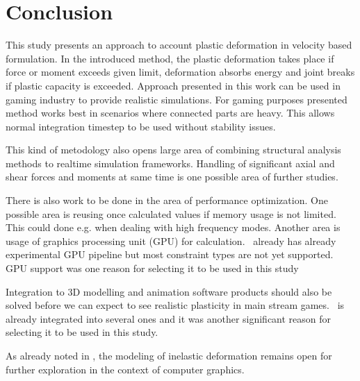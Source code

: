 \section{Conclusion}

This study presents an approach to account plastic deformation in 
velocity based formulation.
In the introduced method, the plastic deformation takes place if force or moment exceeds given 
limit, deformation absorbs energy and joint breaks if plastic capacity is exceeded. 
Approach presented in this work can be used in gaming industry to provide realistic 
simulations. 
For gaming purposes presented method works 
best in scenarios where connected parts are heavy. This allows normal 
integration timestep to be used without stability issues. 

This kind of metodology also opens large area of combining  structural analysis
methods to realtime simulation frameworks.
Handling of significant axial and shear forces and moments at same time
is one possible area of further studies.

There is also work to be done in the area of performance optimization.
One possible area is reusing once calculated values if memory usage is not limited.
This could done e.g. when dealing with high frequency modes.
Another area is usage of graphics processing unit (GPU) for calculation.
\bullet\ already has already experimental GPU pipeline but most constraint types are not 
yet supported. GPU support was one reason for selecting
it to be used in this study

Integration to 3D modelling and animation software products 
should also be solved before we can expect to
see realistic plasticity in main stream games. 
\bullet\ is already integrated into several ones and it was another significant reason for selecting
it to be used in this study.

As already noted in \cite{cg1988}, the modeling of inelastic deformation
remains open for further exploration in the context of computer graphics.

